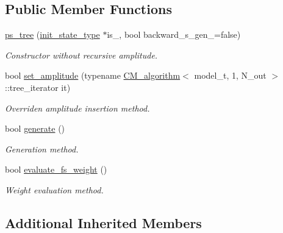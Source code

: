 \subsection*{Public Member Functions}
\begin{DoxyCompactItemize}
\item 
\hypertarget{a00456_a6f7f9925c8ed1f62495ea56e338789d1}{}\hyperlink{a00456_a6f7f9925c8ed1f62495ea56e338789d1}{ps\+\_\+tree} (\hyperlink{a00308}{init\+\_\+state\+\_\+type} $\ast$is\+\_\+, bool backward\+\_\+s\+\_\+gen\+\_\+=false)\label{a00456_a6f7f9925c8ed1f62495ea56e338789d1}

\begin{DoxyCompactList}\small\item\em Constructor without recursive amplitude. \end{DoxyCompactList}\item 
\hypertarget{a00456_a9b5d41866e54c3f62effa49890372617}{}bool \hyperlink{a00456_a9b5d41866e54c3f62effa49890372617}{set\+\_\+amplitude} (typename \hyperlink{a00065}{C\+M\+\_\+algorithm}$<$ model\+\_\+t, 1, N\+\_\+out $>$\+::tree\+\_\+iterator it)\label{a00456_a9b5d41866e54c3f62effa49890372617}

\begin{DoxyCompactList}\small\item\em Overriden amplitude insertion method. \end{DoxyCompactList}\item 
\hypertarget{a00456_ad91a1695b8d82e9b88318bc32442457f}{}bool \hyperlink{a00456_ad91a1695b8d82e9b88318bc32442457f}{generate} ()\label{a00456_ad91a1695b8d82e9b88318bc32442457f}

\begin{DoxyCompactList}\small\item\em Generation method. \end{DoxyCompactList}\item 
\hypertarget{a00456_a69d87f33d66f123671ef619b2ae2fdf2}{}bool \hyperlink{a00456_a69d87f33d66f123671ef619b2ae2fdf2}{evaluate\+\_\+fs\+\_\+weight} ()\label{a00456_a69d87f33d66f123671ef619b2ae2fdf2}

\begin{DoxyCompactList}\small\item\em Weight evaluation method. \end{DoxyCompactList}\end{DoxyCompactItemize}
\subsection*{Additional Inherited Members}



